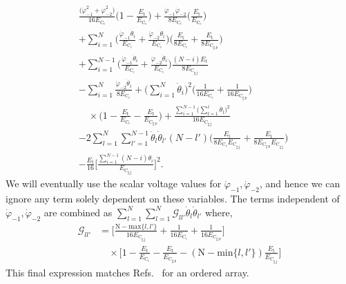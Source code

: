 \documentclass[%
reprint,
superscriptaddress,
 amsmath,amssymb,
 aps,
 prx,
longbibliography,
floatfix,
]{revtex4-2}
\begin{document}
\begin{align}
&\frac{\big(\dot{\varphi}^2_{-1}+\dot{\varphi}^2_{-2}\big)}{16E_{\textrm{C}_\textrm{c}}}\Big(1-\frac{E_\textrm{t}}{E_{\textrm{C}_\textrm{c}}}\Big)+\frac{\dot{\varphi}_{-1}\dot{\varphi}_{-2}}{8E_{\textrm{C}_\textrm{c}}}\Big(\frac{E_\textrm{t}}{E_{\textrm{C}_\textrm{c}}}\Big)\nonumber\\
&+\sum_{i=1}^N\Big(\frac{\dot{\varphi}_{-1}\dot{\theta}_i}{E_{\textrm{C}_\textrm{c}}}+\frac{\dot{\varphi}_{-2}\dot{\theta}_i}{E_{\textrm{C}_\textrm{c}}}\Big)\Big(\frac{E_\textrm{t}}{8E_{\textrm{C}_\textrm{c}}}+\frac{E_\textrm{t}}{8E_{\textrm{C}_\textrm{g,p}}}\Big)\nonumber\\&+\sum_{i=1}^{N-1}\Big(\frac{\dot{\varphi}_{-1}\dot{\theta}_i}{E_{\textrm{C}_\textrm{c}}}+\frac{\dot{\varphi}_{-2}\dot{\theta}_i}{E_{\textrm{C}_\textrm{c}}}\Big)\frac{(N-i)E_\textrm{t}}{8E_{\textrm{C}_\textrm{g,j}}}\nonumber\\
&-\sum_{i=1}^N\frac{\dot{\varphi}_{-2}\dot{\theta}_i}{8E_{\textrm{C}_\textrm{c}}}+\Big(\sum_{i=1}^N\dot{\theta}_i\Big)^2\Bigg(\frac{1}{16E_{\textrm{C}_\textrm{c}}}+\frac{1}{16E_{\textrm{C}_\textrm{g,p}}}\Bigg)\nonumber\\&\quad\times\Bigg(1-\frac{E_\textrm{t}}{E_{\textrm{C}_\textrm{c}}}-\frac{E_\textrm{t}}{E_{\textrm{C}_\textrm{g,p}}}\Bigg)+\frac{\sum_{i=1}^{N-1}\big(\sum_{l=1}^i\dot{\theta}_l\big)^2}{16E_{\textrm{C}_\textrm{g,j}}}\nonumber\\
&-2\sum_{l=1}^N \sum_{l'=1}^{N-1}\dot{\theta}_l\dot{\theta}_{l'}(N-l')\Bigg(\frac{E_\textrm{t}}{8E_{\textrm{C}_\textrm{c}}E_{\textrm{C}_\textrm{g,j}}}+\frac{E_\textrm{t}}{8E_{\textrm{C}_\textrm{g,p}}E_{\textrm{C}_\textrm{g,j}}}\Bigg)\nonumber\\
&-\frac{E_\textrm{t}}{16}\Bigg[\frac{\sum_{i=1}^{N-1}(N-i)\theta_i}{E_{\textrm{C}_\textrm{g,j}}}\Bigg]^2.
\end{align}
We will eventually use the scalar voltage values for $\dot{\varphi}_{-1},\dot{\varphi}_{-2}$, and hence we can ignore any term solely dependent on these variables. The terms independent of $\dot{\varphi}_{-1},\dot{\varphi}_{-2}$ are combined as $\sum_{l=1}^{N}\sum_{l=1}^{N}\mathcal{G}_{ll'}\dot{\theta}_l\dot{\theta}_{l'}$ where,
\begin{align}
\mathcal{G}_{ll'}&=\Big[\frac{\textrm{N}-\text{max}\{l,l'\}}{16E_{\textrm{C}_\textrm{g,j}}}+\frac{1}{16E_{\textrm{C}_\textrm{c}}}+\frac{1}{16E_{\textrm{C}_\textrm{g,p}}}\Big]\nonumber\\&\quad\times\Big[1-\frac{E_\textrm{t}}{E_{\textrm{C}_\textrm{c}}}-\frac{E_\textrm{t}}{E_{\textrm{C}_\textrm{g,p}}}-(\textrm{N}-\text{min}\{l,l'\})\frac{E_\textrm{t}}{E_{\textrm{C}_\textrm{g,j}}}\Big]
\end{align}
This final expression matches Refs.~\cite{ferguson2013symmetries,viola2015collective} for an ordered array.
\end{document}
